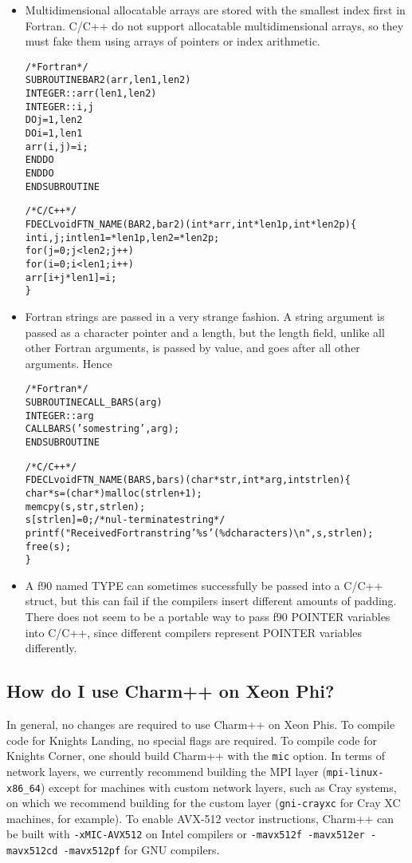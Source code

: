 \begin{itemize}
\item Multidimensional allocatable arrays are stored with
the smallest index first in Fortran.  C/C++ do not support
allocatable multidimensional arrays, so they must fake them
using arrays of pointers or index arithmetic.

\begin{alltt}
/* Fortran */
SUBROUTINE BAR2(arr,len1,len2) 
    INTEGER :: arr(len1,len2)
    INTEGER :: i,j
    DO j=1,len2
      DO i=1,len1
        arr(i,j)=i;
      END DO
    END DO
END SUBROUTINE

/* C/C++ */
FDECL void FTN\_NAME(BAR2,bar2)(int *arr,int *len1p,int *len2p) \{
    int i,j; int len1=*len1p, len2=*len2p;
    for (j=0;j<len2;j++)
    for (i=0;i<len1;i++)
        arr[i+j*len1]=i;
\}
\end{alltt}

\item Fortran strings are passed in a very strange fashion.
A string argument is passed as a character pointer and a 
length, but the length field, unlike all other Fortran arguments,
is passed by value, and goes after all other arguments.
Hence 

\begin{alltt}
/* Fortran */
SUBROUTINE CALL\_BARS(arg) 
    INTEGER :: arg
    CALL BARS('some string',arg);
END SUBROUTINE

/* C/C++ */
FDECL void FTN\_NAME(BARS,bars)(char *str,int *arg,int strlen) \{
    char *s=(char *)malloc(strlen+1);
    memcpy(s,str,strlen);
    s[strlen]=0; /* nul-terminate string */
    printf("Received Fortran string '\%s' (\%d characters){\textbackslash}n",s,strlen);
    free(s);
\}
\end{alltt}


\item A f90 named TYPE can sometimes successfully be passed into a 
C/C++ struct, but this can fail if the compilers insert different
amounts of padding.  There does not seem to be a portable way to 
pass f90 POINTER variables into C/C++, since different compilers
represent POINTER variables differently.  

\end{itemize}

\subsection{How do I use Charm++ on Xeon Phi?}

In general, no changes are required to use Charm++ on Xeon Phis. To
compile code for Knights Landing, no special flags are required. To
compile code for Knights Corner, one should build Charm++ with the
{\tt mic} option. In terms of network layers, we currently recommend
building the MPI layer ({\tt mpi-linux-x86\_64}) except for machines with
custom network layers, such as Cray systems, on which we recommend
building for the custom layer ({\tt gni-crayxc} for Cray XC machines,
for example). To enable AVX-512 vector instructions, Charm++ can be
built with {\tt -xMIC-AVX512} on Intel compilers or {\tt -mavx512f
  -mavx512er -mavx512cd -mavx512pf} for GNU compilers.

